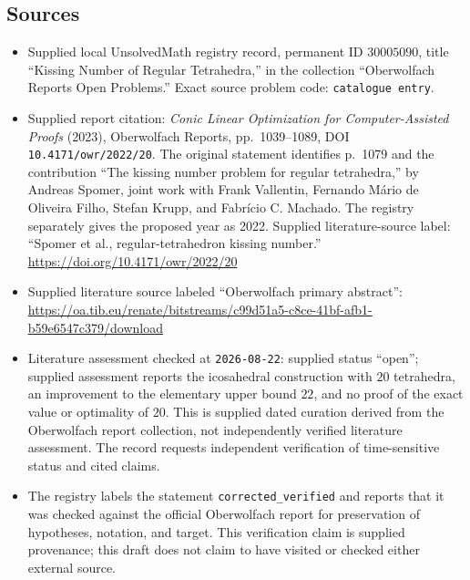 \documentclass[11pt]{article}
\begin{document}
\subsection{Sources}
\begin{itemize}
\item Supplied local UnsolvedMath registry record, permanent ID \(30005090\), title ``Kissing Number of Regular Tetrahedra,'' in the collection ``Oberwolfach Reports Open Problems.'' Exact source problem code: \texttt{catalogue entry}.
\item Supplied report citation: \emph{Conic Linear Optimization for Computer-Assisted Proofs} (2023), Oberwolfach Reports, pp.~1039--1089, DOI \texttt{10.4171/owr/2022/20}. The original statement identifies p.~1079 and the contribution ``The kissing number problem for regular tetrahedra,'' by Andreas Spomer, joint work with Frank Vallentin, Fernando M\'{a}rio de Oliveira Filho, Stefan Krupp, and Fabr\'{i}cio C. Machado. The registry separately gives the proposed year as 2022. Supplied literature-source label: ``Spomer et al., regular-tetrahedron kissing number.'' \url{https://doi.org/10.4171/owr/2022/20}
\item Supplied literature source labeled ``Oberwolfach primary abstract'': \url{https://oa.tib.eu/renate/bitstreams/c99d51a5-c8ce-41bf-afb1-b59e6547c379/download}
\item Literature assessment checked at \texttt{2026-08-22}: supplied status ``open''; supplied assessment reports the icosahedral construction with \(20\) tetrahedra, an improvement to the elementary upper bound \(22\), and no proof of the exact value or optimality of \(20\). This is supplied dated curation derived from the Oberwolfach report collection, not independently verified literature assessment. The record requests independent verification of time-sensitive status and cited claims.
\item The registry labels the statement \texttt{corrected\_verified} and reports that it was checked against the official Oberwolfach report for preservation of hypotheses, notation, and target. This verification claim is supplied provenance; this draft does not claim to have visited or checked either external source.
\end{itemize}
\end{document}
